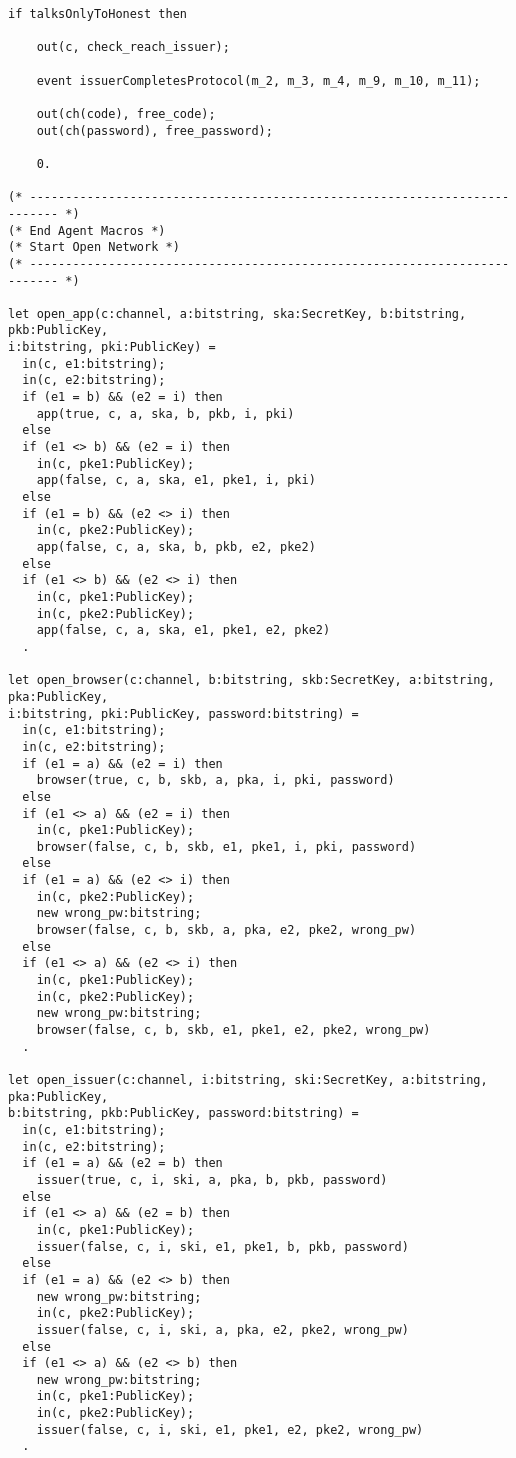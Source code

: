 \begin{Verbatim}[fontsize=\small]
    if talksOnlyToHonest then

    out(c, check_reach_issuer);

    event issuerCompletesProtocol(m_2, m_3, m_4, m_9, m_10, m_11);

    out(ch(code), free_code);
    out(ch(password), free_password);

    0.

(* -------------------------------------------------------------------------- *)
(* End Agent Macros *)
(* Start Open Network *)
(* -------------------------------------------------------------------------- *)

let open_app(c:channel, a:bitstring, ska:SecretKey, b:bitstring, pkb:PublicKey, 
i:bitstring, pki:PublicKey) =
  in(c, e1:bitstring);
  in(c, e2:bitstring);
  if (e1 = b) && (e2 = i) then
    app(true, c, a, ska, b, pkb, i, pki)
  else
  if (e1 <> b) && (e2 = i) then
    in(c, pke1:PublicKey);
    app(false, c, a, ska, e1, pke1, i, pki)
  else
  if (e1 = b) && (e2 <> i) then
    in(c, pke2:PublicKey);
    app(false, c, a, ska, b, pkb, e2, pke2)
  else
  if (e1 <> b) && (e2 <> i) then
    in(c, pke1:PublicKey);
    in(c, pke2:PublicKey);
    app(false, c, a, ska, e1, pke1, e2, pke2)
  .

let open_browser(c:channel, b:bitstring, skb:SecretKey, a:bitstring, pka:PublicKey, 
i:bitstring, pki:PublicKey, password:bitstring) =
  in(c, e1:bitstring);
  in(c, e2:bitstring);
  if (e1 = a) && (e2 = i) then
    browser(true, c, b, skb, a, pka, i, pki, password)
  else
  if (e1 <> a) && (e2 = i) then
    in(c, pke1:PublicKey);
    browser(false, c, b, skb, e1, pke1, i, pki, password)
  else
  if (e1 = a) && (e2 <> i) then
    in(c, pke2:PublicKey);
    new wrong_pw:bitstring;
    browser(false, c, b, skb, a, pka, e2, pke2, wrong_pw)
  else
  if (e1 <> a) && (e2 <> i) then
    in(c, pke1:PublicKey);
    in(c, pke2:PublicKey);
    new wrong_pw:bitstring;
    browser(false, c, b, skb, e1, pke1, e2, pke2, wrong_pw)
  .

let open_issuer(c:channel, i:bitstring, ski:SecretKey, a:bitstring, pka:PublicKey, 
b:bitstring, pkb:PublicKey, password:bitstring) =
  in(c, e1:bitstring);
  in(c, e2:bitstring);
  if (e1 = a) && (e2 = b) then
    issuer(true, c, i, ski, a, pka, b, pkb, password)
  else
  if (e1 <> a) && (e2 = b) then
    in(c, pke1:PublicKey);
    issuer(false, c, i, ski, e1, pke1, b, pkb, password)
  else
  if (e1 = a) && (e2 <> b) then
    new wrong_pw:bitstring;
    in(c, pke2:PublicKey);
    issuer(false, c, i, ski, a, pka, e2, pke2, wrong_pw)
  else
  if (e1 <> a) && (e2 <> b) then
    new wrong_pw:bitstring;
    in(c, pke1:PublicKey);
    in(c, pke2:PublicKey);
    issuer(false, c, i, ski, e1, pke1, e2, pke2, wrong_pw)
  .


\end{Verbatim}
